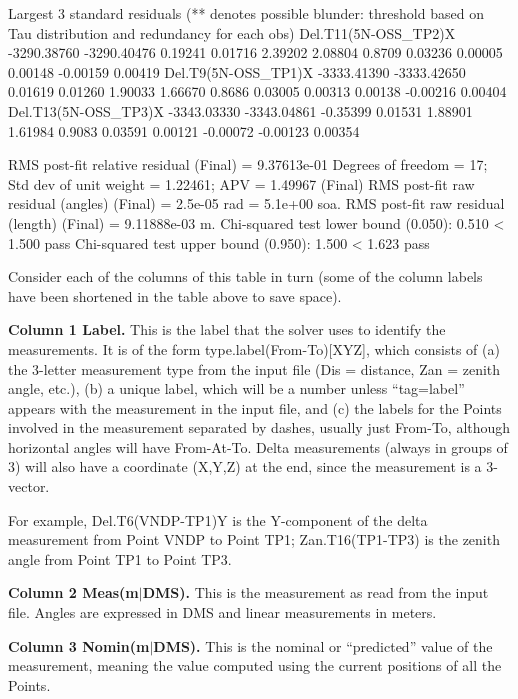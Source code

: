 \begin{landscape}
\begin{Snippet}
 Largest 3 standard residuals (** denotes possible blunder: threshold based on Tau distribution and redundancy for each obs)
 Del.T11(5N-OSS_TP2)X     -3290.38760  -3290.40476      0.19241       0.01716   2.39202   2.08804  0.8709        0.03236      0.00005      0.00148     -0.00159     0.00419
 Del.T9(5N-OSS_TP1)X      -3333.41390  -3333.42650      0.01619       0.01260   1.90033   1.66670  0.8686        0.03005      0.00313      0.00138     -0.00216     0.00404
 Del.T13(5N-OSS_TP3)X     -3343.03330  -3343.04861     -0.35399       0.01531   1.88901   1.61984  0.9083        0.03591      0.00121     -0.00072     -0.00123     0.00354

 RMS post-fit relative residual (Final) = 9.37613e-01
 Degrees of freedom = 17; Std dev of unit weight = 1.22461; APV = 1.49967 (Final)
 RMS post-fit raw residual (angles) (Final) = 2.5e-05 rad = 5.1e+00 soa.
 RMS post-fit raw residual (length) (Final) = 9.11888e-03 m.
 Chi-squared test lower bound (0.050): 0.510 < 1.500 pass
 Chi-squared test upper bound (0.950): 1.500 < 1.623 pass
\end{Snippet}
\normalsize
\end{landscape}

\normalsize
Consider each of the columns of this table in turn (some of the column labels have been shortened in the table above to save space). 

\textbf{Column 1 Label.} This is the label that the solver uses to identify the measurements. It is of the form type.label(From-To)[XYZ], which consists of (a) the 3-letter measurement type from the input file (Dis = distance, Zan = zenith angle, etc.), (b) a unique label, which will be a number unless ``tag=label'' appears with the measurement in the input file, and (c) the labels for the Points involved in the measurement separated by dashes, usually just From-To, although horizontal angles will have From-At-To. Delta measurements (always in groups of 3) will also have a coordinate (X,Y,Z) at the end, since the measurement is a 3-vector.

For example, Del.T6(VNDP-TP1)Y is the Y-component of the delta measurement from Point VNDP to Point TP1; Zan.T16(TP1-TP3) is the zenith angle from Point TP1 to Point TP3.

\textbf{Column 2 Meas(m$\mid$DMS).} This is the measurement as read from the input file. Angles are expressed in DMS and linear measurements in meters.

\textbf{Column 3 Nomin(m$\mid$DMS).} This is the nominal or ``predicted'' value of the measurement, meaning the value computed using the current positions of all the Points.

